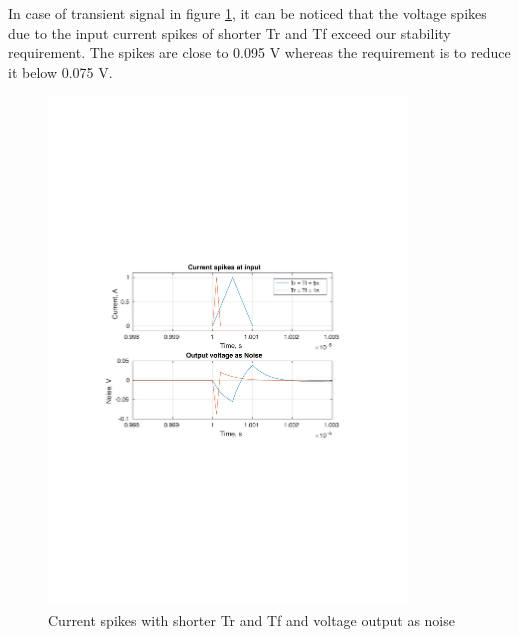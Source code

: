 \documentclass[12pt,a4paper,UKenglish]{article}
\begin{document}
In case of transient signal in figure \ref{cap_tran2}, it can be noticed that the voltage spikes due to the input current spikes of shorter Tr and Tf exceed our stability requirement. The spikes are close to 0.095 V whereas the requirement is to reduce it below 0.075 V.
\begin{figure} [H]
  \centering 
  \includegraphics[width=0.85\textwidth]{img/3f_tran.pdf} 
  \caption{Current spikes with shorter Tr and Tf and voltage output as noise}
  \label{cap_tran2} 
\end{figure}
\end{document}
